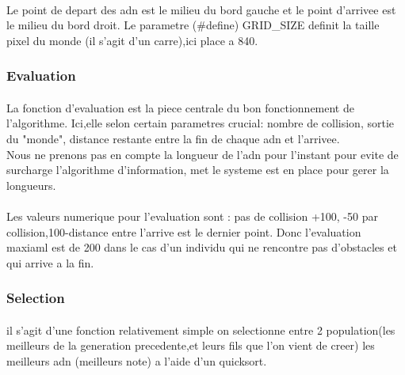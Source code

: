 \documentclass{article}
\begin{document}
  \paragraph{} %
  \label{par:}
    Le point de depart des adn est le milieu du bord gauche et le point d'arrivee est le
    milieu du bord droit. Le parametre (#define) GRID\_SIZE definit la taille pixel du
    monde (il s'agit d'un carre),ici place a 840.

    \subsubsection{Evaluation} %
    \label{ssub:Evaluation}
      \paragraph{} %
      \label{par:}
      La fonction d'evaluation est la piece centrale du bon fonctionnement de l'algorithme.
      Ici,elle selon certain parametres crucial: nombre de collision, sortie du "monde",
      distance restante entre la fin de chaque adn et l'arrivee.\\
      Nous ne prenons pas en compte la longueur de l'adn pour l'instant pour evite de
      surcharge l'algorithme d'information, met le systeme est en place pour gerer la
      longueurs.
      \paragraph{} %
      \label{par:}
      Les valeurs numerique pour l'evaluation sont : pas de collision +100, -50 par
      collision,100-distance entre l'arrive est le dernier point. Donc l'evaluation
      maxiaml est de 200 dans le cas d'un individu qui ne rencontre pas d'obstacles et qui
      arrive a la fin.

    \subsubsection{Selection} %
    \label{ssub:Selection}
      \paragraph{} %
      \label{par:}
        il s'agit d'une fonction relativement simple on selectionne entre 2 population(les
        meilleurs de la generation precedente,et leurs fils que l'on vient de creer) les
        meilleurs adn (meilleurs note) a l'aide d'un quicksort.
    
\end{document}
